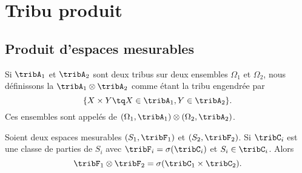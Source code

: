 
\section{Tribu produit}

\subsection{Produit d'espaces mesurables}

\begin{definition}      \label{DefTribProfGfYTuR}
	Si \( \tribA_1\) et \( \tribA_2\) sont deux tribus sur deux ensembles \( \Omega_1\) et \( \Omega_2\), nous définissons la  \( \tribA_1\otimes\tribA_2\) comme étant la tribu engendrée par
	\begin{equation}
		\{ X\times Y\tq X\in\tribA_1,Y\in\tribA_2 \}.
	\end{equation}
	Ces ensembles sont appelés  de \( (\Omega_1,\tribA_1)\otimes (\Omega_2,\tribA_2)\).
\end{definition}

\begin{proposition}        \label{PropLJJWooKqWlTr}
	Soient deux espaces mesurables \( (S_1,\tribF_1)\) et \( (S_2,\tribF_2)\). Si \( \tribC_i\) est une classe de parties de \( S_i\) avec \( \tribF_i=\sigma(\tribC_i)\) et \( S_i\in\tribC_i\). Alors
	\begin{equation}
		\tribF_1\otimes \tribF_2=\sigma(\tribC_1\times \tribC_2).
	\end{equation}
\end{proposition}

